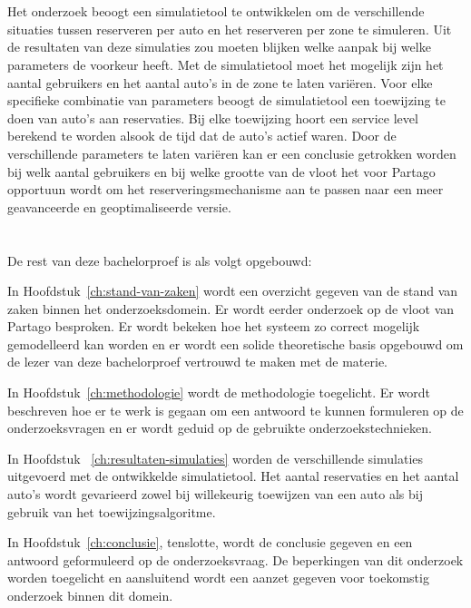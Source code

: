 \section{}
\label{sec:onderzoeksdoelstelling}

Het onderzoek beoogt een simulatietool te ontwikkelen om de verschillende situaties tussen reserveren per auto en het reserveren per zone te simuleren. Uit de resultaten van deze simulaties zou moeten blijken welke aanpak bij welke parameters de voorkeur heeft. Met de simulatietool moet het mogelijk zijn het aantal gebruikers en het aantal auto's in de zone te laten variëren. Voor elke specifieke combinatie van parameters beoogt de simulatietool een toewijzing te doen van auto's aan reservaties. Bij elke toewijzing hoort een service level berekend te worden alsook de tijd dat de auto's actief waren. Door de verschillende parameters te laten variëren kan er een conclusie getrokken worden bij welk aantal gebruikers en bij welke grootte van de vloot het voor Partago opportuun wordt om het reserveringsmechanisme aan te passen naar een meer geavanceerde en geoptimaliseerde versie.

\section{}
\label{sec:opzet-bachelorproef}


De rest van deze bachelorproef is als volgt opgebouwd:

In Hoofdstuk~\ref{ch:stand-van-zaken} wordt een overzicht gegeven van de stand van zaken binnen het onderzoeksdomein. Er wordt eerder onderzoek op de vloot van Partago besproken. Er wordt bekeken hoe het systeem zo correct mogelijk gemodelleerd kan worden en er wordt een solide theoretische basis opgebouwd om de lezer van deze bachelorproef vertrouwd te maken met de materie.

In Hoofdstuk~\ref{ch:methodologie} wordt de methodologie toegelicht. Er wordt beschreven hoe er te werk is gegaan om een antwoord te kunnen formuleren op de onderzoeksvragen en er wordt geduid op de gebruikte onderzoekstechnieken.

In Hoofdstuk ~\ref{ch:resultaten-simulaties} worden de verschillende simulaties uitgevoerd met de ontwikkelde simulatietool. Het aantal reservaties en het aantal auto's wordt gevarieerd zowel bij willekeurig toewijzen van een auto als bij gebruik van het toewijzingsalgoritme.

In Hoofdstuk~\ref{ch:conclusie}, tenslotte, wordt de conclusie gegeven en een antwoord geformuleerd op de onderzoeksvraag. De beperkingen van dit onderzoek worden toegelicht en aansluitend wordt een aanzet gegeven voor toekomstig onderzoek binnen dit domein.